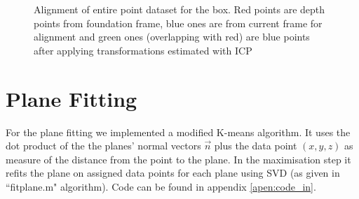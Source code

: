 \documentclass[12pt,a4paper,onecolumn]{article}
\begin{document}
\begin{figure}[h]	
    \centering
      \caption{Alignment of entire point dataset for the box. Red points are depth points from
      foundation frame, blue ones are from current frame for alignment and green ones (overlapping with red)
      are blue points after applying transformations estimated with ICP}
\end{figure}

\section{Plane Fitting}
For the plane fitting we implemented a modified K-means algorithm.
It uses the dot product of the the planes' normal vectors $\vec{n}$  plus the data point $ (x,y,z) $ as measure of the distance from the point to the plane. In the maximisation step it refits the
plane on assigned data points for each plane
 using SVD (as given in ``fitplane.m"
algorithm). Code can be found in appendix \ref{apen:code_in}.
\end{document}
